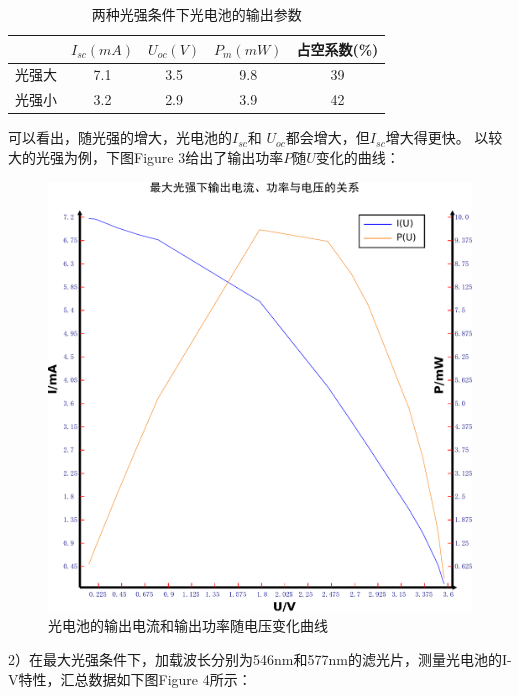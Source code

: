 ﻿\documentclass[10.5pt]{ctexart}
\begin{document}
\begin{table}[!ht]
\centering
\begin{tabular}{ccccc}
\hline
&$I_{sc}(mA)$&$U_{oc}(V)$&$P_m(mW)$&占空系数(\%)\\
\hline
光强大&7.1&3.5&9.8&39\\
光强小&3.2&2.9&3.9&42\\
\hline
\end{tabular}
\caption{两种光强条件下光电池的输出参数}
\end{table}

可以看出，随光强的增大，光电池的$I_{sc}$和 $U_{oc}$都会增大，但$I_{sc}$增大得更快。
以较大的光强为例，下图Figure 3给出了输出功率$P$随$U$变化的曲线：
\begin{figure}[!ht]
\centering
\caption{光电池的输出电流和输出功率随电压变化曲线}
\includegraphics[width=400pt]{OutputSolarCellCurve.pdf}
\end{figure}
2）在最大光强条件下，加载波长分别为546nm和577nm的滤光片，测量光电池的I-V特性，汇总数据如下图Figure 4所示：
\end{document}
